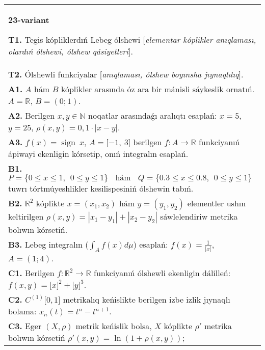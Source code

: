 \documentclass{article}
\DeclareMathOperator{\sign}{sign}
\begin{document}
\begin{tabular}{m{17cm}}
\textbf{23-variant}
\newline

\textbf{T1.} Tegis kópliklerdıń Lebeg ólshewi [\textit{elementar kóplikler anıqlaması, olardıń ólshewi, ólshew qásiyetleri}]. \\
\textbf{T2.} Ólshewli funkciyalar [\textit{anıqlaması, ólshew boyınsha jıynaqlılıq}]. \\
\textbf{A1.} \(A\) hám \(B\) kóplikler arasında óz ara bir mánisli sáykeslik ornatıń. \(A\mathbb{= R}\), \(B = (0;1)\). \\
\textbf{A2.} Berilgen \(x,y\mathbb{\in N}\) noqatlar arasındaǵı aralıqtı esaplań: \(x = 5\), \(y = 25\), \(\rho(x,y) = 0,1 \cdot |x - y|\). \\
\textbf{A3.} \(f(x) = \sign \ x\), \(A = \lbrack - 1,\ 3\rbrack\) berilgen \(f:A\rightarrow\mathbb{R}\) funkciyanıń ápiwayi ekenligin kórsetip, onıń integralın esaplań. \\
\textbf{B1.} \(P = \{ 0 \leq x \leq 1,\ \ 0 \leq y \leq 1\}\ \ \ \ \text{hám}\ \ \ \ Q = \{ 0.3 \leq x \leq 0.8,\ \ 0 \leq y \leq 1\}\) tuwrı tórtmúyeshlikler kesilispesiniń ólshewin tabıń. \\
\textbf{B2.} \(\mathbb{R}^{2}\) kóplikte \(x = \left( x_{1},x_{2} \right)\) hám \(y = \left( y_{1},y_{2} \right)\) elementler ushın keltirilgen \(\rho(x,y) = \left| x_{1} - y_{1} \right| + \left| x_{2} - y_{2} \right|\) sáwlelendiriw metrika bolıwın kórsetiń. \\
\textbf{B3.} Lebeg integralın (\(\int_{A}^{}{f(x)d\mu}\)) esaplań: \(f(x) = \frac{1}{\lbrack x\rbrack}\), \(A = (1;4)\). \\
\textbf{C1.} Berilgen \(f:\mathbb{R}^{2}\mathbb{\rightarrow R}\) funkciyanıń ólshewli ekenligin dálilleń: \(f(x,y) = \lbrack x\rbrack^{2} + \lbrack y\rbrack^{3}\). \\
\textbf{C2.} \(C^{(1)}\lbrack 0,1\rbrack\) metrikalıq keńislikte berilgen izbe izlik jıynaqlı bolama: \(x_{n}(t) = t^{n} - t^{n + 1}\). \\
\textbf{C3.} Eger \((X,\rho)\) metrik keńislik bolsa, \(X\) kóplikte \(\rho'\) metrika bolıwın kórsetiń \(\rho'(x,y) = \ln\left( 1 + \rho(x,y) \right)\); \\

\end{tabular}
\vspace{1cm}
\end{document}
